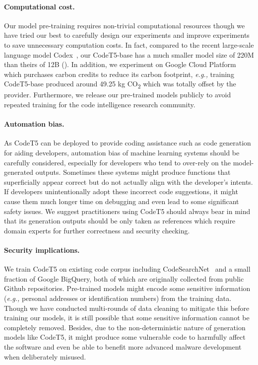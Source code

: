 \documentclass[11pt]{article}
\newcommand{\eg}{{\em e.g.,}\xspace}
\begin{document}
\paragraph{Computational cost.} Our model pre-training requires non-trivial computational resources though we have tried our best to carefully design our experiments and improve experiments to save unnecessary computation costs. In fact, compared to the recent large-scale language model Codex~\cite{DBLP:journals/corr/abs-2107-03374}, our CodeT5-base has a much smaller model size of 220M than theirs of 12B ().  In addition, we experiment on Google Cloud Platform which purchases carbon credits to reduce its carbon footprint, \eg training CodeT5-base produced around 49.25 kg CO\textsubscript{2} which was totally offset by the provider.
Furthermore, we release our pre-trained models publicly to avoid repeated training for the code intelligence research community.

\paragraph{Automation bias.} As CodeT5 can be deployed to provide coding assistance such as code generation for aiding developers,  automation bias of machine learning systems should be carefully considered, especially for developers who tend to over-rely on the model-generated outputs. Sometimes these systems might produce functions that superficially appear correct but do not actually align with the developer’s intents. If developers unintentionally adopt these incorrect code suggestions, it might cause them much longer time on debugging and even lead to some significant safety issues. We suggest 
practitioners using CodeT5 should always bear in mind that its generation outputs  should be only taken as references which require domain experts for further correctness and security checking.

\paragraph{Security implications.} 
We train CodeT5 on existing  code corpus including CodeSearchNet~\cite{DBLP:journals/corr/abs-1909-09436} and a small fraction of Google BigQuery, both of which are originally collected from public Github repositories.
Pre-trained models might encode some sensitive information (\eg personal addresses or  identification numbers) from the training data. 
Though we have  conducted multi-rounds of data cleaning to mitigate this before training our models, it is still possible that some sensitive information cannot be completely removed. Besides, due to the non-deterministic nature of generation models like CodeT5, it might produce some vulnerable code to harmfully affect the software and even be able to benefit more advanced malware development when deliberately misused.
\end{document}
